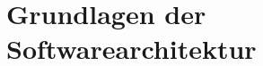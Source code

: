 \chapter{Grundlagen der Softwarearchitektur}
\label{cha:grundlagen_der_softwarearchitektur}
    
    
    